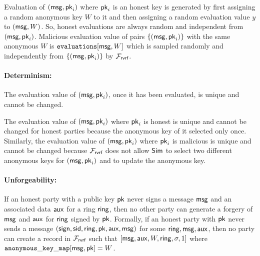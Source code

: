 	
	Evaluation of $ (\mathsf{msg}, \mathsf{pk}_i) $ where $ \mathsf{pk}_i $ is an honest key is generated by first assigning a random anonymous key $ W $ to it and then assigning a random evaluation value $ y $ to $ (\mathsf{msg}, W)$. So, honest evaluations are always random and independent from $ (\mathsf{msg},\mathsf{pk}_i) $. Malicious evaluation value of pairs $ \{(\mathsf{msg}, \mathsf{pk}_i)\} $ with the same anonymous $ W $ is $ \texttt{evaluations}[\mathsf{msg},W] $ which is sampled randomly and independently from $ \{(\mathsf{msg},\mathsf{pk}_i)\} $ by $ \mathcal{F}_{\textsf{rvrf}} $.
	
	
	
	
	\paragraph{Determinism:} The evaluation value  of $ (\mathsf{msg}, \mathsf{pk}_i) $, once it has been evaluated, is unique and  cannot be changed. 
	
	The evaluation value of $ (\mathsf{msg}, \mathsf{pk}_i) $ where $ \mathsf{pk}_i $ is honest is unique and cannot be changed for honest parties because the anonymous key of it selected only once. Similarly, the evaluation value of $ (\mathsf{msg}, \mathsf{pk}_i) $ where $ \mathsf{pk}_i $ is malicious is unique and cannot be changed because $ \mathcal{F}_{\textsf{rvrf}} $ does not allow $ \mathsf{Sim} $ to select two different anonymous keys for  $ (\mathsf{msg}, \mathsf{pk}_i) $ and to update the anonymous key.
	
	\paragraph{Unforgeability:}  If an honest party with a public key $ \mathsf{pk} $ never signs a message $ \mathsf{msg} $  and an associated data $ \mathsf{aux} $ for a ring $ \mathsf{ring} $, then no other party can generate a  forgery of $ \mathsf{msg} $ and $ \mathsf{aux} $ for $ \mathsf{ring} $ signed by $ \mathsf{pk} $. Formally, if an honest party with $ \mathsf{pk} $ never sends a message $(\mathsf{sign}, \textsf{sid}, \mathsf{ring}, \mathsf{pk},\mathsf{aux}, \mathsf{msg})$ for some $ \mathsf{ring}, \mathsf{msg}, \mathsf{aux} $, then  no party can create a record in $ \mathcal{F}_{\textsf{rvrf}} $ such that $ [\mathsf{msg}, \mathsf{aux},W,\mathsf{ring}, \sigma, 1] $ where $ \mathtt{anonymous\_key\_map}[\mathsf{msg},\mathsf{pk}] = W $.
	
